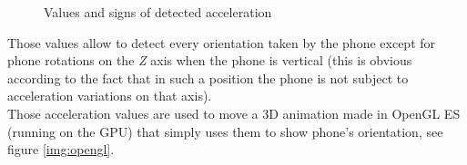 \documentclass[conference, 11pt]{IEEEtran}
\begin{document}
\begin{figure}[!ht]
\begin{center}
\caption{Values and signs of detected acceleration}
\end{center}
\end{figure}

Those values allow to detect every orientation taken by the phone except for phone rotations on the \textit{Z} axis when the phone is vertical (this is obvious according to the fact that in such a position the phone is not subject to acceleration variations on that axis).\\
Those acceleration values are used to move a 3D animation made in OpenGL ES (running on the GPU) that simply uses them to show phone's orientation, see figure \ref{img:opengl}.
\end{document}
